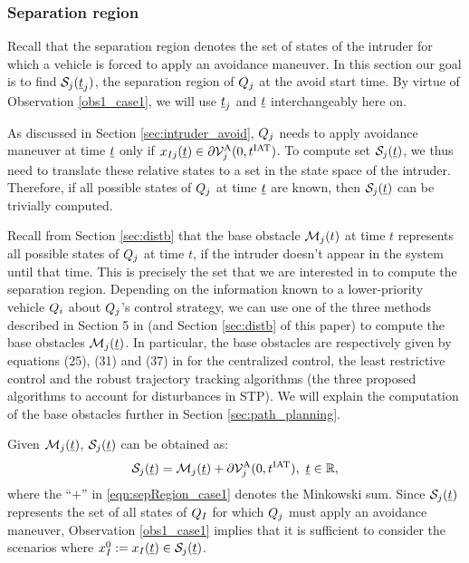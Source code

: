 \subsubsection{Separation region} \label{sec:sepRegion_case1}
Recall that the separation region denotes the set of states of the intruder for which a vehicle is forced to apply an avoidance maneuver. In this section our goal is to find $\mathcal{S}_j(\underline{t}_j)$, the separation region of $Q_j$ at the avoid start time. By virtue of Observation \ref{obs1_case1}, we will use $\underline{t}_j$ and $\underline{t}$ interchangeably here on.
%

As discussed in Section \ref{sec:intruder_avoid}, $Q_j$ needs to apply avoidance maneuver at time $\underline{t}$ only if $x_{I j}(\underline{t}) \in \partial \mathcal{V}^{\text{A}}_{j}(0, t^\text{IAT})$. To compute set $\mathcal{S}_j(\underline{t})$, we thus need to translate these relative states to a set in the state space of the intruder. Therefore, if all possible states of $Q_j$ at time $\underline{t}$ are known, then $\mathcal{S}_j(\underline{t})$ can be trivially computed.

Recall from Section \ref{sec:distb} that the base obstacle $\mathcal{M}_j(t)$ at time $t$ represents all possible states of $Q_j$ at time $t$, if the intruder doesn't appear in the system until that time. This is precisely the set that we are interested in to compute the separation region.
%
Depending on the information known to a lower-priority vehicle $Q_i$ about $Q_j$'s control strategy, we can use one of the three methods described in Section 5 in \cite{Chen2016d} (and Section \ref{sec:distb} of this paper) to compute the base obstacles $\mathcal{M}_j(\underline{t})$. In particular, the base obstacles are respectively given by equations (25), (31) and (37) in \cite{Chen2016d} for the centralized control, the least restrictive control and the robust trajectory tracking algorithms (the three proposed algorithms to account for disturbances in STP). We will explain the computation of the base obstacles further in Section \ref{sec:path_planning}.

Given $\mathcal{M}_j(\underline{t})$, $\mathcal{S}_j(\underline{t})$ can be obtained as:
\begin{equation} \label{eqn:sepRegion_case1}
\sep_j(\tsa) = \boset_j(\tsa) + \partial \brs^{\text{A}}_{j}(0, \iat), ~\tsa \in \R,
\end{equation}
where the ``$+$'' in \eqref{eqn:sepRegion_case1} denotes the Minkowski sum. Since $\mathcal{S}_j(\underline{t})$ represents the set of all states of $Q_I$ for which $Q_j$ must apply an avoidance maneuver, Observation \ref{obs1_case1} implies that it is sufficient to consider the scenarios where $x_{I}^0 := x_{I}(\underline{t}) \in \mathcal{S}_j(\underline{t})$.